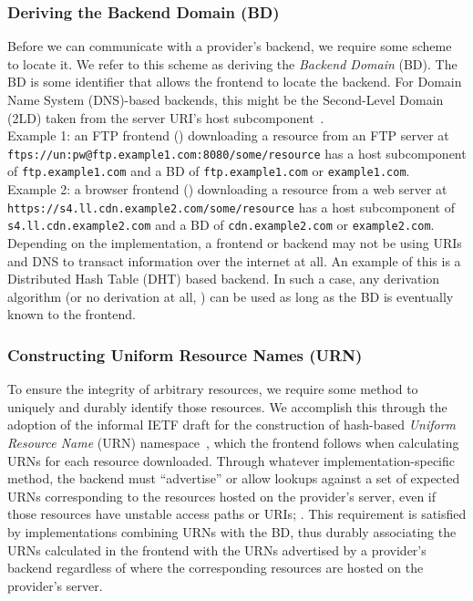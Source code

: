 \subsubsection{Deriving the Backend Domain (BD)}

Before we can communicate with a provider's backend, we require some scheme to
locate it. We refer to this scheme as deriving the \emph{Backend Domain} (BD).
The BD is some identifier that allows the frontend to locate the backend. For
Domain Name System (DNS)-based backends, this might be the Second-Level Domain
(2LD) taken from the server URI's host subcomponent~\cite{RFC3986}. \\

Example 1: an FTP frontend () downloading a
resource from an FTP server at
\texttt{ftps://un:pw@ftp.example1.com:8080/some/resource} has a host
subcomponent of \texttt{ftp.example1.com} and a BD of \texttt{ftp.example1.com}
or \texttt{example1.com}. \\

Example 2: a browser frontend ()
downloading a resource from a web server at
\texttt{https://s4.ll.cdn.example2.com/some/resource} has a host subcomponent of
\texttt{s4.ll.cdn.example2.com} and a BD of \texttt{cdn.example2.com} or
\texttt{example2.com}. \\

Depending on the implementation, a frontend or backend may not be using URIs and
DNS to transact information over the internet at all. An example of this is a
Distributed Hash Table (DHT) based backend. In such a case, any derivation
algorithm (or no derivation at all, ) can be used as
long as the BD is eventually known to the frontend.

\subsubsection{Constructing Uniform Resource Names (URN)}

To ensure the integrity of arbitrary resources, we require some method to
uniquely and durably identify those resources. We accomplish this through the
adoption of the informal IETF draft for the construction of hash-based
\emph{Uniform Resource Name} (URN) namespace~\cite{draft-URN}, which the
frontend follows when calculating URNs for each resource downloaded. Through
whatever implementation-specific method, the backend must ``advertise'' or allow
lookups against a set of expected URNs corresponding to the resources hosted on
the provider's server, even if those resources have unstable access paths or
URIs; . This requirement is satisfied by implementations combining URNs with
the BD, thus durably associating the URNs calculated in the frontend with the
URNs advertised by a provider's backend regardless of where the corresponding
resources are hosted on the provider's server.

